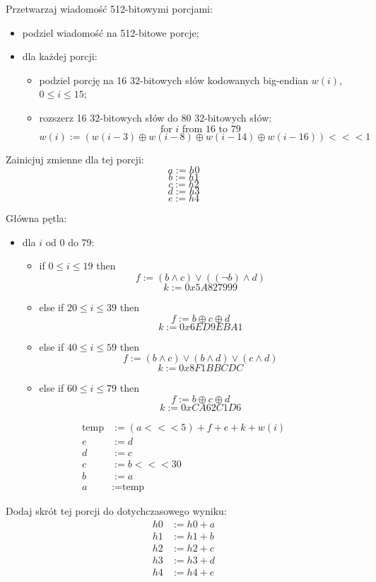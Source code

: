 \documentclass[12pt, letterpaper]{article}
\begin{document}
Przetwarzaj wiadomość 512-bitowymi porcjami:
\begin{itemize}
    \item podziel wiadomość na 512-bitowe porcje;
    \item dla każdej porcji:
    \begin{itemize}
        \item podziel porcję na 16 32-bitowych słów kodowanych big-endian \(w(i)\), \(0 \leq i \leq 15\);
        \item rozszerz 16 32-bitowych słów do 80 32-bitowych słów:
        \[ \text{for } i \text{ from } 16 \text{ to } 79 \]
        \[ w(i) := (w(i-3) \oplus w(i-8) \oplus w(i-14) \oplus w(i-16)) <<< 1 \]
    \end{itemize}
\end{itemize}

Zainicjuj zmienne dla tej porcji:
\[ a := h0 \]
\[ b := h1 \]
\[ c := h2 \]
\[ d := h3 \]
\[ e := h4 \]

Główna pętla:
\begin{itemize}
    \item dla \(i\) od 0 do 79:
    \begin{itemize}
        \item if \(0 \leq i \leq 19\) then
        \[ f := (b \land c) \lor ((\lnot b) \land d) \]
        \[ k := 0x5A827999 \]
        \item else if \(20 \leq i \leq 39\) then
        \[ f := b \oplus c \oplus d \]
        \[ k := 0x6ED9EBA1 \]
        \item else if \(40 \leq i \leq 59\) then
        \[ f := (b \land c) \lor (b \land d) \lor (c \land d) \]
        \[ k := 0x8F1BBCDC \]
        \item else if \(60 \leq i \leq 79\) then
        \[ f := b \oplus c \oplus d \]
        \[ k := 0xCA62C1D6 \]
    \end{itemize}
\end{itemize}
\begin{align*}
    \text{temp} & := (a <<< 5) + f + e + k + w(i) \\
    e & := d \\
    d & := c \\
    c & := b <<< 30 \\
    b & := a \\
    a & := \text{temp}
\end{align*}

Dodaj skrót tej porcji do dotychczasowego wyniku:
\begin{align*}
    h0 & := h0 + a \\
    h1 & := h1 + b \\
    h2 & := h2 + c \\
    h3 & := h3 + d \\
    h4 & := h4 + e
\end{align*}
\end{document}
